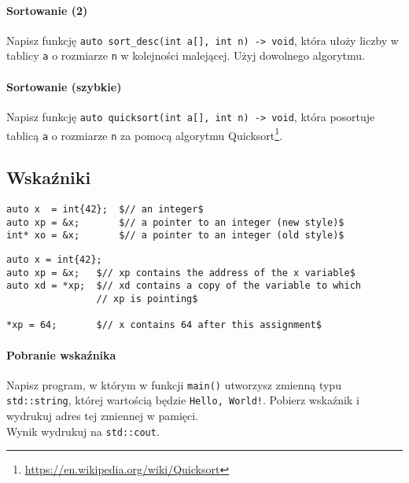 \documentclass[11pt,a4paper,titlepage,onecolumn]{article}
\begin{document}
\paragraph{Sortowanie (2)} Napisz funkcję \texttt{auto sort\_desc(int a[], int n) ->
void}, która ułoży liczby w tablicy \texttt{a} o rozmiarze \texttt{n} w
kolejności malejącej. Użyj dowolnego algorytmu.

\paragraph{Sortowanie (szybkie)} Napisz funkcję \texttt{auto quicksort(int a[], int n) ->
void}, która posortuje tablicą \texttt{a} o rozmiarze \texttt{n} za pomocą
algorytmu Quicksort\footnote{\url{https://en.wikipedia.org/wiki/Quicksort}}.

\subsection{Wskaźniki}

\begin{lstlisting}[caption={pobranie wskaźnika},
    captionpos=b,
    label=listing_howto_address_of]
auto x  = int{42};  $// an integer$
auto xp = &x;       $// a pointer to an integer (new style)$
int* xo = &x;       $// a pointer to an integer (old style)$
\end{lstlisting}

\begin{lstlisting}[caption={dereferencja wskaźnika},
    captionpos=b,
    label=listing_howto_pointer_dereference]
auto x = int{42};
auto xp = &x;   $// xp contains the address of the x variable$
auto xd = *xp;  $// xd contains a copy of the variable to which
                // xp is pointing$

*xp = 64;       $// x contains 64 after this assignment$
\end{lstlisting}

\paragraph{Pobranie wskaźnika} Napisz program, w którym w funkcji
\texttt{main()} utworzysz zmienną typu \texttt{std::string}, której wartością
będzie \texttt{Hello, World!}. Pobierz wskaźnik i wydrukuj adres tej zmiennej w
pamięci.\\
Wynik wydrukuj na \texttt{std::cout}.
\end{document}
